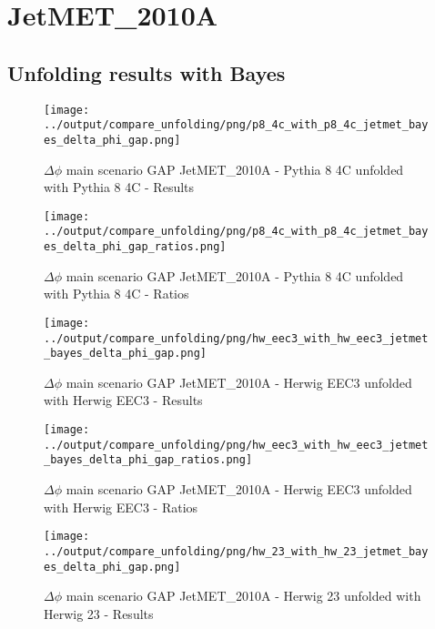 \documentclass[11pt]{book}
\begin{document}
\clearpage
\section{JetMET\_2010A}
\subsection{Unfolding results with Bayes}

\begin{figure}[ht]
\centering
\texttt{[image: ../output/compare\_unfolding/png/p8\_4c\_with\_p8\_4c\_jetmet\_bayes\_delta\_phi\_gap.png]}
\caption{$\Delta\phi$ main scenario GAP JetMET\_2010A - Pythia 8 4C unfolded with Pythia 8 4C - Results}
\label{p8_p8_jetmet_bayes_delta_phi_gap_a}
\end{figure}

\begin{figure}[ht]
\centering
\texttt{[image: ../output/compare\_unfolding/png/p8\_4c\_with\_p8\_4c\_jetmet\_bayes\_delta\_phi\_gap\_ratios.png]}
\caption{$\Delta\phi$ main scenario GAP JetMET\_2010A - Pythia 8 4C unfolded with Pythia 8 4C - Ratios}
\label{p8_p8_jetmet_bayes_delta_phi_gap_b}
\end{figure}

\begin{figure}[ht]
\centering
\texttt{[image: ../output/compare\_unfolding/png/hw\_eec3\_with\_hw\_eec3\_jetmet\_bayes\_delta\_phi\_gap.png]}
\caption{$\Delta\phi$ main scenario GAP JetMET\_2010A - Herwig EEC3 unfolded with Herwig EEC3 - Results}
\label{hw_eec3_hw_eec3_jetmet_bayes_delta_phi_gap_a}
\end{figure}

\begin{figure}[ht]
\centering
\texttt{[image: ../output/compare\_unfolding/png/hw\_eec3\_with\_hw\_eec3\_jetmet\_bayes\_delta\_phi\_gap\_ratios.png]}
\caption{$\Delta\phi$ main scenario GAP JetMET\_2010A - Herwig EEC3 unfolded with Herwig EEC3 - Ratios}
\label{hw_eec3_hw_eec3_jetmet_bayes_delta_phi_gap_b}
\end{figure}

\begin{figure}[ht]
\centering
\texttt{[image: ../output/compare\_unfolding/png/hw\_23\_with\_hw\_23\_jetmet\_bayes\_delta\_phi\_gap.png]}
\caption{$\Delta\phi$ main scenario GAP JetMET\_2010A - Herwig 23 unfolded with Herwig 23 - Results}
\label{hw_23_hw_23_jetmet_bayes_delta_phi_gap_a}
\end{figure}
\end{document}
